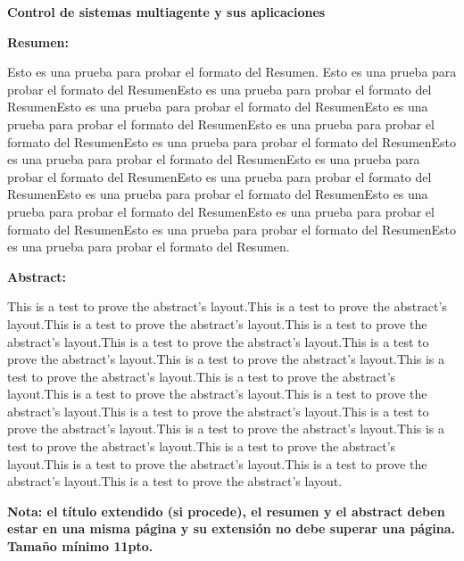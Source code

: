 \documentclass[11pt, a4paper]{article} %
\begin{document}
{\bfseries \large Control de sistemas multiagente y sus aplicaciones }\vspace{10mm} 

{\bfseries \large Resumen:} \vspace{5mm}

Esto es una prueba para probar el formato del Resumen. Esto es una prueba para probar el formato del ResumenEsto es una prueba para probar el formato del ResumenEsto es una prueba para probar el formato del ResumenEsto es una prueba para probar el formato del ResumenEsto es una prueba para probar el formato del ResumenEsto es una prueba para probar el formato del ResumenEsto es una prueba para probar el formato del ResumenEsto es una prueba para probar el formato del ResumenEsto es una prueba para probar el formato del ResumenEsto es una prueba para probar el formato del ResumenEsto es una prueba para probar el formato del ResumenEsto es una prueba para probar el formato del ResumenEsto es una prueba para probar el formato del ResumenEsto es una prueba para probar el formato del Resumen.
\vspace{1cm}

{\bfseries \large Abstract: }\vspace{5mm} 

This is a test to prove the abstract's layout.This is a test to prove the abstract's layout.This is a test to prove the abstract's layout.This is a test to prove the abstract's layout.This is a test to prove the abstract's layout.This is a test to prove the abstract's layout.This is a test to prove the abstract's layout.This is a test to prove the abstract's layout.This is a test to prove the abstract's layout.This is a test to prove the abstract's layout.This is a test to prove the abstract's layout.This is a test to prove the abstract's layout.This is a test to prove the abstract's layout.This is a test to prove the abstract's layout.This is a test to prove the abstract's layout.This is a test to prove the abstract's layout.This is a test to prove the abstract's layout.This is a test to prove the abstract's layout.This is a test to prove the abstract's layout.
\vspace{1cm}

{\Large\textbf{Nota: el título extendido (si procede), el resumen y el abstract deben estar en una misma página y su extensión no debe superar una página. Tamaño mínimo 11pto.}}
\vspace{1cm}
\end{document}
